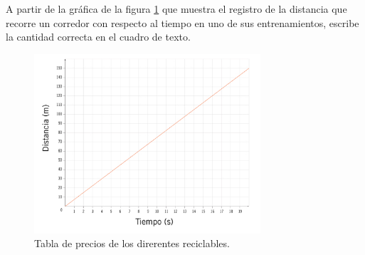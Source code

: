 \question[10] A partir de la gráfica de la figura \ref{fig:SINMAT1_U3_AC75_IMG2} que muestra el registro de la distancia que recorre un corredor con respecto al tiempo en uno de sus entrenamientos, escribe la cantidad correcta en el cuadro de texto.
\begin{figure}[H]
    \centering
    \includegraphics[width=0.75\textwidth]{../images/SINMAT1_U3_AC75_IMG2.jpg}
    \caption{Tabla de precios de los direrentes reciclables.}
    \label{fig:SINMAT1_U3_AC75_IMG2}
\end{figure}
\begin{parts}
    
    
    
    
    

\end{parts}
